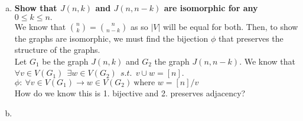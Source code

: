 \begin{enumerate}[a)]
\begin{center}
\end{center} 
    \boldmath
    \item \textbf{Show that $J(n, k)$ and $J(n, n-k)$ are isomorphic for any $0 \leq k \leq n.$} \\ 
    \linebreak 
    \unboldmath
    We know that $\binom{n}{k} = \binom{n}{n-k}$ as so $|V|$ will be equal for both. Then, to show the graphs are isomorphic, we must find the bijection $\phi$ that preserves the structure of the graphs. \\
    \linebreak 
    Let $G_1$ be the graph $J(n,k)$ and $G_2$ the graph $J(n, n-k)$. We know that $\forall v \in V(G_1) \:\: \exists w \in V(G_2) \:\: s.t.\:\: v \cup w = [n]$. \\
    \linebreak 
    $\phi : \: \forall v \in V(G_1) \rightarrow w \in V(G_2) \: \text{where } w = [n]/v $ \\
    \linebreak 
    How do we know this is 1. bijective and 2. preserves adjacency?
    \item 
\end{enumerate}
